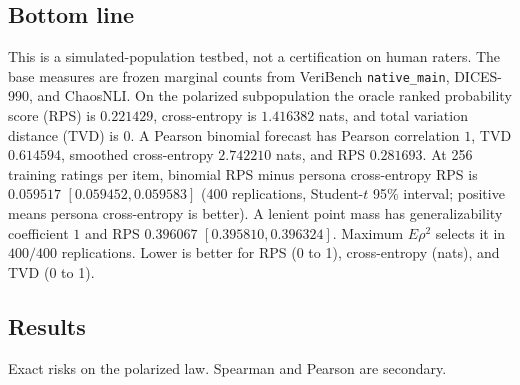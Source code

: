 
\subsection*{Bottom line}

This is a simulated-population testbed, not a certification on human raters. The base measures are frozen marginal counts from VeriBench \texttt{native\_main}, DICES-990, and ChaosNLI. On the polarized subpopulation the oracle ranked probability score (RPS) is \(0.221429\), cross-entropy is \(1.416382\) nats, and total variation distance (TVD) is \(0\). A Pearson binomial forecast has Pearson correlation \(1\), TVD \(0.614594\), smoothed cross-entropy \(2.742210\) nats, and RPS \(0.281693\). At 256 training ratings per item, binomial RPS minus persona cross-entropy RPS is \(0.059517\) \([0.059452, 0.059583]\) (400 replications, Student-\(t\) 95\% interval; positive means persona cross-entropy is better). A lenient point mass has generalizability coefficient \(1\) and RPS \(0.396067\) \([0.395810, 0.396324]\). Maximum \(E\rho^{2}\) selects it in \(400/400\) replications. Lower is better for RPS (0 to 1), cross-entropy (nats), and TVD (0 to 1).

\subsection*{Results}

Exact risks on the polarized law. Spearman and Pearson are secondary.


